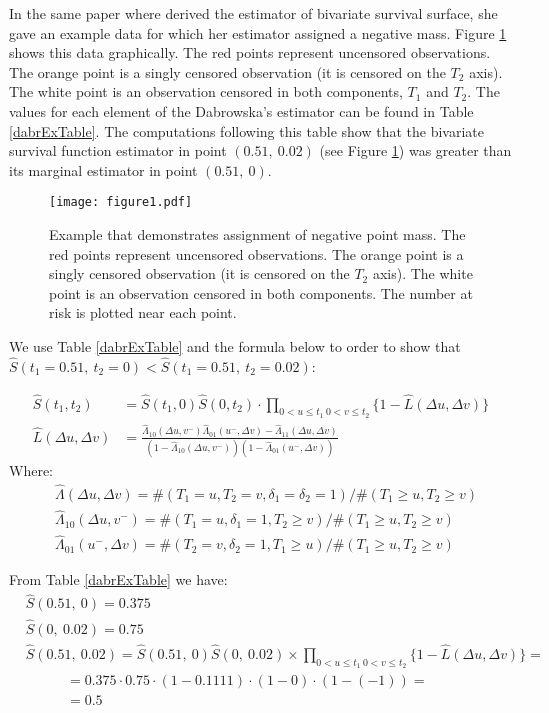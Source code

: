 \documentclass[]{article}
\begin{document}
In the same paper where \cite{dabrowska1988kaplan} derived the estimator of bivariate survival surface, she gave an example data for which her estimator assigned a negative mass. Figure \ref{fig:bubbles} shows this data graphically. The red points represent uncensored observations. The orange point is a singly censored observation (it is censored on the $T_2$ axis). The white point is an observation censored in both components, $T_1$ and $T_2$. The values for each element of the Dabrowska's estimator can be found in Table \ref{dabrExTable}. The computations following this table show that the bivariate survival function estimator in point $(0.51,~0.02)$ (see Figure \ref{fig:bubbles}) was greater than its marginal estimator in point $(0.51,~0)$.
\begin{figure}[!h]
\caption{Example that demonstrates assignment of negative point mass. The red points represent uncensored observations. The orange point is a singly censored observation (it is censored on the $T_2$ axis). The white point is an observation censored in both components. The number at risk is plotted near each point.}
\texttt{[image: figure1.pdf]}
\label{fig:bubbles}
\end{figure}

We use Table \ref{dabrExTable} and the formula below to order to show that $\hat{S}(t_1=0.51,~t_2=0) < \hat{S}(t_1=0.51,~t_2=0.02)$:

	$$
	\begin{aligned}
		\hat{S}(t_1,t_2) &= \hat{S}(t_1,0)\hat{S}(0,t_2)\cdot \prod_{{0<u\leq t_1~0<v\leq t_2}}\{1 - \hat{L}(\Delta u, \Delta v)\}\\
		\hat{L}(\Delta u, \Delta v) &= \frac{\hat{\Lambda}_{10}(\Delta u,v^-)\hat{\Lambda}_{01}(u^-,\Delta v) - \hat{\Lambda}_{11}(\Delta u, \Delta v)}{\left(1-\hat{\Lambda}_{10}(\Delta u,v^-)\right)\left(1-\hat{\Lambda}_{01}(u^-,\Delta v)\right)}
	\end{aligned}
	$$
Where:
	$$
	\begin{aligned}
	&\hat{\Lambda}(\Delta u, \Delta v) = \#(T_1=u, T_2=v, \delta_1=\delta_2=1)/\#(T_1\geq u, T_2\geq v)\\
	&\hat{\Lambda}_{10}(\Delta u, v^-) = \#(T_1=u, \delta_1=1, T_2\geq v)/\#(T_1\geq u, T_2\geq v)\\
	&\hat{\Lambda}_{01}(u^-,\Delta  v) = \#(T_2=v, \delta_2=1, T_1\geq u)/\#(T_1\geq u, T_2\geq v)
	\end{aligned}
	$$



From Table \ref{dabrExTable} we have:
	$$
	\begin{aligned}
		&\hat{S}(0.51,~0)  = 0.375\\
		&\hat{S}(0,~0.02)  = 0.75\\
		&\hat{S}(0.51,~0.02) = \hat{S}(0.51,~0)\hat{S}(0,~0.02) \times 
		\prod_{{0<u\leq t_1~0<v\leq t_2}}\{1 - \hat{L}(\Delta u, \Delta v)\}=\\
		&~~~~~~~~~~~~~= 0.375 \cdot 0.75 \cdot (1-0.1111)\cdot (1-0)\cdot (1-(-1)) = \\
		&~~~~~~~~~~~~~= 0.5
	\end{aligned}
	$$
\end{document}
